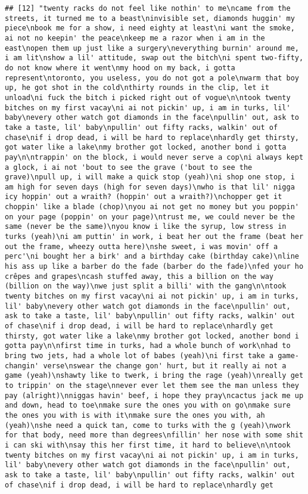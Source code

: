 \documentclass[]{article}
\begin{document}
\begin{verbatim}
## [12] "twenty racks do not feel like nothin' to me\ncame from the streets, it turned me to a beast\ninvisible set, diamonds huggin' my piece\nbook me for a show, i need eighty at least\ni want the smoke, ai not no keepin' the peace\nkeep me a razor when i am in the east\nopen them up just like a surgery\neverything burnin' around me, i am lit\nshow a lil' attitude, swap out the bitch\ni spent two-fifty, do not know where it went\nmy hood on my back, i gotta represent\ntoronto, you useless, you do not got a pole\nwarm that boy up, he got shot in the cold\nthirty rounds in the clip, let it unload\ni fuck the bitch i picked right out of vogue\n\ntook twenty bitches on my first vacay\ni ai not pickin' up, i am in turks, lil' baby\nevery other watch got diamonds in the face\npullin' out, ask to take a taste, lil' baby\npullin' out fifty racks, walkin' out of chase\nif i drop dead, i will be hard to replace\nhardly get thirsty, got water like a lake\nmy brother got locked, another bond i gotta pay\n\ntrappin' on the block, i would never serve a cop\ni always kept a glock, i ai not 'bout to see the grave ('bout to see the grave)\npull up, i will make a quick stop (yeah)\ni shop one stop, i am high for seven days (high for seven days)\nwho is that lil' nigga icy hoppin' out a wraith? (hoppin' out a wraith?)\nchopper get it choppin' like a blade (chop)\nyou ai not get no money but you poppin' on your page (poppin' on your page)\ntrust me, we could never be the same (never be the same)\nyou know i like the syrup, low stress in turks (yeah)\ni am puttin' in work, i beat her out the frame (beat her out the frame, wheezy outta here)\nshe sweet, i was movin' off a perc'\ni bought her a birk' and a birthday cake (birthday cake)\nline his ass up like a barber do the fade (barber do the fade)\nfed your ho crêpes and grapes\ncash stuffed away, this a billion on the way (billion on the way)\nwe just split a billi' with the gang\n\ntook twenty bitches on my first vacay\ni ai not pickin' up, i am in turks, lil' baby\nevery other watch got diamonds in the face\npullin' out, ask to take a taste, lil' baby\npullin' out fifty racks, walkin' out of chase\nif i drop dead, i will be hard to replace\nhardly get thirsty, got water like a lake\nmy brother got locked, another bond i gotta pay\n\nfirst time in turks, had a whole bunch of work\nhad to bring two jets, had a whole lot of babes (yeah)\ni first take a game-changin' verse\nswear the change gon' hurt, but it really ai not a game (yeah)\nshawty like to twerk, i bring the rage (yeah)\nreally get to trippin' on the stage\nnever ever let them see the man unless they pay (alright)\nniggas havin' beef, i hope they pray\ncactus jack me up and down, head to toe\nmake sure the ones you with on go\nmake sure the ones you with is with it\nmake sure the ones you with, ah (yeah)\nshe need a quick tan, come to turks with the g (yeah)\nwork for that body, need more than degrees\nfillin' her nose with some shit i can ski with\nsay this her first time, it hard to believe\n\ntook twenty bitches on my first vacay\ni ai not pickin' up, i am in turks, lil' baby\nevery other watch got diamonds in the face\npullin' out, ask to take a taste, lil' baby\npullin' out fifty racks, walkin' out of chase\nif i drop dead, i will be hard to replace\nhardly get 
\end{verbatim}
\end{document}
